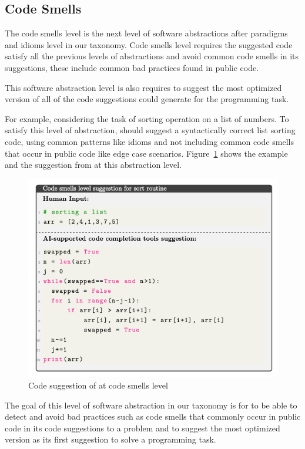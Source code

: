 \subsection{Code Smells}
The code smells level is the next level of software abstractions after paradigms and idioms level in our taxonomy. 
Code smells level requires the suggested code satisfy all the previous levels of abstractions and avoid common code smells in its suggestions, these include common bad practices found in public code. 

This software abstraction level is also requires \cct{} to suggest the most optimized version of all of the code suggestions \cct{} could generate for the programming task.

For example, considering the task of sorting operation on a list of numbers. To satisfy this level of abstraction, \cct{} should suggest a syntactically correct list sorting code, using common patterns like idioms and not including common code smells that occur in public code like edge case scenarios. 
Figure~\ref{fig:smells} shows the example and the suggestion from \cct{} at this abstraction level.

\begin{figure}[hbt!]
    \centering
    \includegraphics[width=\linewidth]{Figures/smells.png}
    \caption{Code suggestion of \cct{} at code smells level}
    \label{fig:smells}
\end{figure}

The goal of this level of software abstraction in our taxonomy is for \cct{} to be able to detect and avoid bad practices such as code smells that commonly occur in public code in its code suggestions to a problem and to suggest the most optimized version as its first suggestion to solve a programming task.

